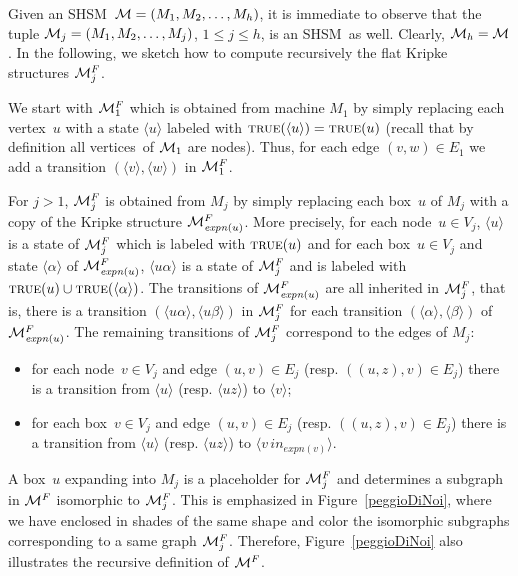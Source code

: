 \documentclass[letterpaper,twocolumn,10pt]{article}
\def    \M          {{\cal M}}
\newcommand{\VHSM}{SHSM}
\newcommand{\boxhsm}{box}   \newcommand{\boxes}{boxes}
\newcommand{\nnode}{node} \newcommand{\nnodes}{nodes} \newcommand{\expand} {\mathit{expn}}
\newcommand{\prop}{\mbox{{\sc true}}}
\newcommand{\vertex}{\mbox{vertex}}   \newcommand{\vertices}{\mbox{vertices}}
\begin{document}
Given an \VHSM\ $\M=(M_1,M_2,\ldots,M_h)$, it is immediate to
observe that the tuple $\M_j=(M_1,M_2,\ldots,M_j)$, $1 \leq j \leq
h$, is an \VHSM\ as well. Clearly, $\M_h=\M$. In the following, we
sketch how to compute recursively the flat Kripke structures
$\M_j^F$.

We start with $\M_1^F$ which is obtained from machine $M_1$ by
simply replacing each \vertex\ $u$ with a state $\langle u \rangle$
labeled with $\prop (\langle u \rangle)=\prop(u)$ (recall that by
definition all \vertices\ of $\M_1$ are \nnodes). Thus, for each
edge $(v,w) \in E_1$ we add a transition $(\langle v \rangle,\langle
w \rangle)$ in $\M_1^F$.

For $j>1$, $\M_j^F$ is obtained from $M_j$ by simply replacing each
\boxhsm\ $u$ of $M_j$ with a copy of the Kripke structure
$\M_{\expand(u)}^F$. More precisely, for each \nnode\ $u \in V_j$,
$\langle u\rangle $ is a state of $\M_j^F$ which is labeled with
$\prop(u)$ and for each \boxhsm\ $u\in V_j$ and state $\langle
\alpha \rangle $ of $\M_{\expand(u)}^F$, $\langle u \alpha \rangle$
is a state of $\M_j^F$ and is labeled with $\prop(u) \cup
\prop(\langle  \alpha \rangle)$. The transitions of
$\M_{\expand(u)}^F$ are all inherited in $\M_j^F$, that is, there is
a transition $(\langle u \alpha \rangle,\langle u \beta \rangle)$ in
$\M_j^F$ for each  transition $(\langle  \alpha \rangle,\langle
\beta \rangle)$ of $\M_{\expand(u)}^F$. The remaining transitions of
$\M_j^F$ correspond to the edges of $M_j$:
\begin{itemize}
\item for each \nnode\ $v\in V_j$ and edge $(u,v) \in E_j$
(resp. $((u,z),v) \in E_j$) there
is a transition
from $\langle u \rangle$ (resp. $\langle u z \rangle$) to $\langle v\rangle$;

\item for each \boxhsm\ $v\in V_j$ and
edge $(u,v) \in E_j$ (resp. $((u,z),v) \in E_j$) there
is a transition from $\langle u \rangle$ (resp.  $\langle u z \rangle$)
to $\langle v\, in_{\expand(v)}\rangle$.
\end{itemize}

A \boxhsm\ $u$ expanding into
$M_j$ is a placeholder for  $\M_j^F$ and determines
a subgraph in  $\M^F$ isomorphic to  $\M_j^F$.
This is emphasized in Figure~\ref{peggioDiNoi}, where
we have enclosed in shades of the same shape and color the isomorphic
subgraphs corresponding to a same graph $\M_j^F$.
Therefore, Figure~\ref{peggioDiNoi} also illustrates
the recursive definition of $\M^F$.
\end{document}
